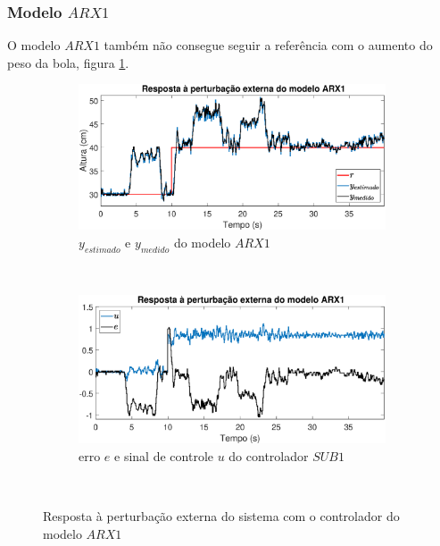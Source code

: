 \subsubsection{Modelo $ARX1$}
O modelo $ARX1$ também não consegue seguir a referência com o aumento do peso da bola, figura \ref{fig:pextrarx1y}.
\begin{figure}[htb]
	\centering
	\begin{subfigure}[t]{0.48\textwidth}
		\includegraphics[width=1\linewidth]{pextrarx1y}
		\caption[$y_{estimado}$ e $y_{medido}$ do modelo $ARX1$]{$y_{estimado}$ e $y_{medido}$ do modelo $ARX1$}
		\label{fig:pextrarx1y}
	\end{subfigure}
	~ %
	\begin{subfigure}[t]{0.48\textwidth}
		\includegraphics[width=1\linewidth]{pextrarx1e}
		\caption[erro $e$ e sinal de controle $u$ do controlador $SUB1$]{erro $e$ e sinal de controle $u$ do controlador $SUB1$}
		\label{fig:pextrarx1e}
	\end{subfigure}
	~ %
	
	\caption{Resposta à perturbação externa do sistema com o controlador do modelo $ARX1$}\label{fig:pextrarx1}
\end{figure}

